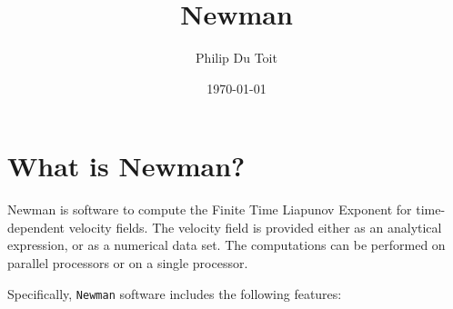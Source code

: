 \documentclass[11pt]{article}
\title{Newman}
\author{Philip Du Toit}
\date{\today}                                           %
\begin{document}
\maketitle

\section{What is Newman?}

Newman is software to compute the Finite Time Liapunov Exponent for time-dependent velocity fields.  The velocity field is provided either as an analytical expression, or as a numerical data set.  The computations can be performed on parallel processors or on a single processor.

Specifically, \texttt{Newman} software includes the following features: 
\end{document}
